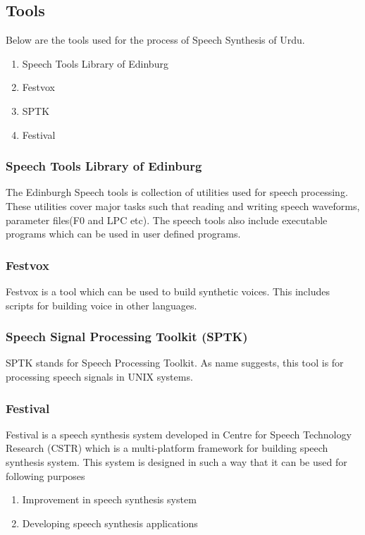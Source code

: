 \begin{itemize}
\subsection{Tools}

Below are the tools used for the process of Speech Synthesis of Urdu.

\begin{enumerate}
  \item Speech Tools Library of Edinburg
  \item Festvox
  \item SPTK
  \item Festival
\end{enumerate}

\subsubsection{Speech Tools Library of Edinburg}
The Edinburgh Speech tools is collection of utilities used for speech processing. These utilities cover major tasks such that reading and 
writing speech waveforms, parameter files(F0 and LPC etc). The speech tools also include executable programs which can 
be used in user defined programs.


\subsubsection{Festvox}
Festvox is a tool which can be used to build synthetic voices. This includes scripts for building voice in other languages.

\subsubsection{ Speech Signal Processing Toolkit (SPTK)}
SPTK stands for Speech Processing Toolkit. As name suggests, this tool is for processing speech signals in UNIX systems. 

\subsubsection{Festival}

Festival is a speech synthesis system developed in Centre for Speech Technology Research (CSTR) which is a multi-platform 
framework for building speech synthesis system. This system is designed in such a way that it can be used for following purposes

\begin{enumerate}
  \item Improvement in speech synthesis system
  \item Developing speech synthesis applications
\end{enumerate}


\end{itemize}
